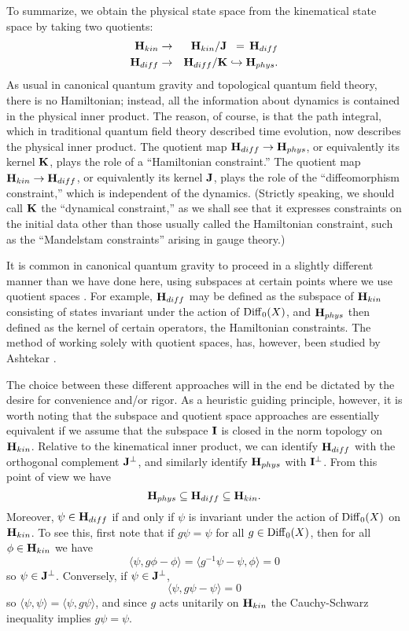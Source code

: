 \documentclass[12pt]{article}
\newcommand{\ban}{\begin{eqnarray*}}
\newcommand{\ean}{\end{eqnarray*}}
\renewcommand{\H}{{\bf H}}
\newcommand{\I}{{\bf I}}
\newcommand{\J}{{\bf J}}
\newcommand{\K}{{\bf K}}
\newcommand{\Diff}{{\rm Diff}}
\begin{document}
To summarize, we obtain the physical state space from the kinematical
state space by taking two quotients:
\ban         \H_{kin} &\to&  \H_{kin}/\J \;\; =\, \H_{diff} \\
             \H_{diff} &\to&  \H_{diff}/\K \hookrightarrow \H_{phys}. \ean
As usual in canonical quantum gravity and topological quantum field
theory, there is no Hamiltonian; instead, all the information about
dynamics is contained in the physical inner product.   The reason, of
course, is that the path integral, which in traditional quantum field
theory described time evolution, now describes the physical inner product.
The quotient map $\H_{diff} \to \H_{phys}$, or equivalently its kernel
$\K$, plays the role of a ``Hamiltonian constraint.''     The quotient map
$\H_{kin} \to \H_{diff}$, or equivalently its kernel $\J$, plays the role
of the ``diffeomorphism constraint,'' which is independent of the dynamics.
(Strictly speaking, we should call $\K$ the ``dynamical constraint,'' as we
shall see that it expresses constraints on the initial data other than
those usually called the Hamiltonian constraint, such as the ``Mandelstam
constraints'' arising in gauge theory.)

It is common in canonical quantum gravity to proceed in a slightly
different manner than we have done here, using subspaces at certain points
where we use quotient spaces \cite{RS,RS2}. For example, $\H_{diff}$ may be
defined as the subspace of $\H_{kin}$ consisting of states invariant under
the action of $\Diff_0(X)$, and $\H_{phys}$ then defined as the kernel of
certain operators, the Hamiltonian constraints.   The method of working
solely with quotient spaces, has, however, been studied by Ashtekar
\cite{Ash}.

The choice between these different approaches will in the end be
dictated by the desire for convenience and/or rigor.  As a heuristic
guiding principle, however, it is worth noting that
the subspace and quotient space approaches are essentially equivalent if
we assume that the subspace $\I$ is closed in the norm topology on
$\H_{kin}$.   Relative to the kinematical inner product, we can identify
$\H_{diff}$ with the orthogonal complement $\J^\perp$, and similarly identify
$\H_{phys}$ with $\I^\perp$.  From this point of
view we have
\[             \H_{phys} \subseteq \H_{diff} \subseteq \H_{kin}  .\]
Moreover, $\psi \in
\H_{diff}$ if and only if $\psi$ is invariant under the action of
$\Diff_0(X)$ on $\H_{kin}$.
To see this, first note that if $g\psi = \psi$ for all $g\in
\Diff_0(X)$, then for all $\phi \in \H_{kin}$ we have
\[         \langle \psi, g\phi - \phi \rangle =
\langle g^{-1}\psi - \psi, \phi \rangle = 0 \]
so $\psi \in \J^{\perp}$.   Conversely, if $\psi \in \J^\perp$,
\[        \langle \psi, g\psi - \psi\rangle = 0 \]
so $\langle \psi,\psi \rangle = \langle\psi,g\psi \rangle$, and since
$g$ acts unitarily on $\H_{kin}$ the Cauchy-Schwarz inequality implies
$g\psi = \psi$.
\end{document}
